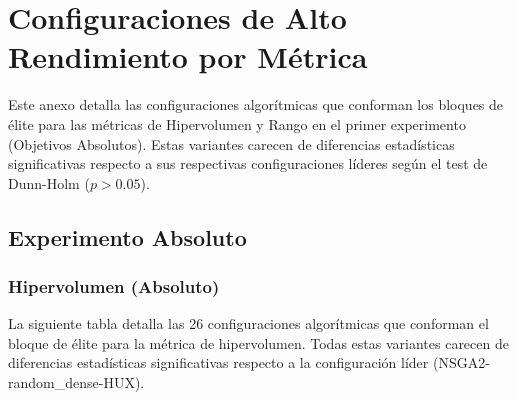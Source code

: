 \chapter{Configuraciones de Alto Rendimiento por Métrica}\label{anexo:elite}

Este anexo detalla las configuraciones algorítmicas que conforman los bloques de élite para las métricas de Hipervolumen y Rango en el primer experimento (Objetivos Absolutos). Estas variantes carecen de diferencias estadísticas significativas respecto a sus respectivas configuraciones líderes según el test de Dunn-Holm ($p > 0.05$).

\section{Experimento Absoluto}

\subsection{Hipervolumen (Absoluto)}\label{anexo:elite_hv}

La siguiente tabla detalla las 26 configuraciones algorítmicas que conforman el bloque de élite para la métrica de hipervolumen. Todas estas variantes carecen de diferencias estadísticas significativas respecto a la configuración líder (NSGA2-random\_dense-HUX).

